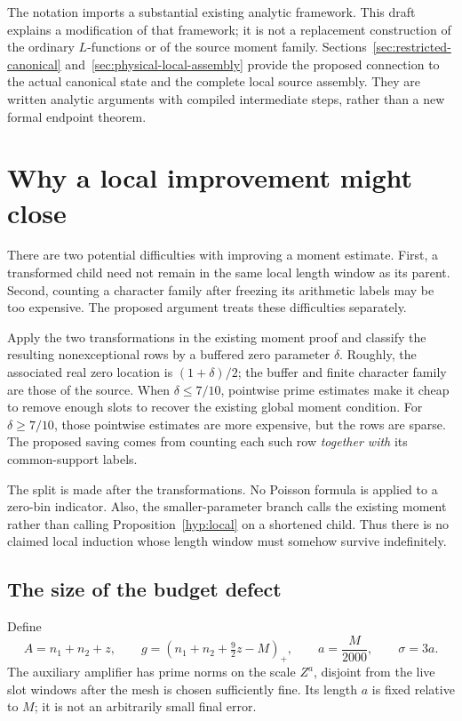 \documentclass[11pt]{article}
\theoremstyle{definition}
\newcommand{\pos}[1]{(#1)_{+}}
\begin{document}
The notation imports a substantial existing analytic framework. This
draft explains a modification of that framework; it is not a replacement
construction of the ordinary $L$-functions or of the source moment family.
Sections~\ref{sec:restricted-canonical} and~\ref{sec:physical-local-assembly}
provide the proposed connection to the actual canonical state and the
complete local source assembly. They are written analytic arguments with
compiled intermediate steps, rather than a new formal endpoint theorem.

\section{Why a local improvement might close}\label{sec:idea}

There are two potential difficulties with improving a moment estimate.
First, a transformed child need not remain in the same local length
window as its parent. Second, counting a character family after freezing
its arithmetic labels may be too expensive. The proposed argument treats
these difficulties separately.

Apply the two transformations in the existing moment proof and classify
the resulting nonexceptional rows by a buffered zero parameter $\delta$.
Roughly, the associated real zero location is $(1+\delta)/2$; the
buffer and finite character family are those of the source. When
$\delta\le7/10$, pointwise prime estimates make it cheap to remove
enough slots to recover the existing global moment condition. For
$\delta\ge7/10$, those pointwise estimates are more expensive, but the
rows are sparse. The proposed saving comes from counting each such row
\emph{together with} its common-support labels.

The split is made after the transformations. No Poisson formula is
applied to a zero-bin indicator. Also, the smaller-parameter branch calls
the existing moment rather than calling Proposition~\ref{hyp:local} on a
shortened child. Thus there is no claimed local induction whose length
window must somehow survive indefinitely.

\subsection{The size of the budget defect}
Define
\begin{equation}\label{eq:budget}
 A=n_1+n_2+z,\qquad
 g=\pos{n_1+n_2+\tfrac92z-M},\qquad
 a=\frac M{2000},\qquad \sigma=3a.
\end{equation}
The auxiliary amplifier has prime norms on the scale $Z^a$, disjoint
from the live slot windows after the mesh is chosen sufficiently fine.
Its length $a$ is fixed relative to $M$; it is not an arbitrarily small
final error.
\end{document}
